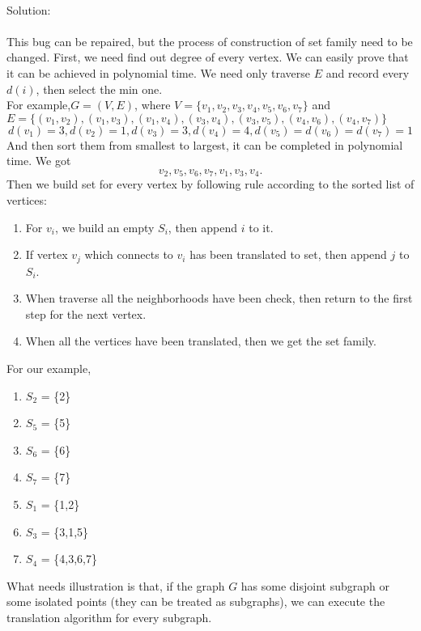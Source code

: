 \documentclass[a4papper]{article}
\theoremstyle{neosn}
\begin{document}
    \correction{}
    \\
    Solution: \\
    \\
    This bug can be repaired, but the process of construction of set family need to be changed.
    First, we need find out degree of every vertex.
    We can easily prove that it can be achieved in polynomial time.
    We need only traverse $E$ and record every $d(i)$, then select the min one. \\
    For example,$G=(V,E)$, where $V=\{v_1, v_2, v_3, v_4, v_5, v_6, v_7\}$ and
    $E=\{(v_1, v_2), (v_1, v_3), (v_1, v_4), (v_3, v_4), (v_3, v_5), (v_4, v_6), (v_4, v_7)\}$
    \[
        d(v_1) = 3, d(v_2) = 1, d(v_3) = 3, d(v_4) = 4, d(v_5) = d(v_6) = d(v_7) = 1
    \]
    And then sort them from smallest to largest, it can be completed in polynomial time.
    We got
    \[
        v_2, v_5, v_6, v_7, v_1, v_3, v_4.
    \]
    Then we build set for every vertex by following rule according to the sorted list of vertices:
    \begin{enumerate}
        \item For $v_i$, we build an empty $S_i$, then append $i$ to it.
        \item If vertex $v_j$ which connects to $v_i$ has been translated to set, then append $j$ to $S_i$.
        \item When traverse all the neighborhoods have been check, then return to the first step for the next vertex.
        \item When all the vertices have been translated, then we get the set family.
    \end{enumerate}

    For our example,
    \begin{enumerate}
        \item $S_2$ = \{2\}
        \item $S_5$ = \{5\}
        \item $S_6$ = \{6\}
        \item $S_7$ = \{7\}
        \item $S_1$ = \{1,2\}
        \item $S_3$ = \{3,1,5\}
        \item $S_4$ = \{4,3,6,7\}
    \end{enumerate}

    What needs illustration is that, if the graph $G$ has some disjoint subgraph or some isolated points
    (they can be treated as subgraphs), we can execute the translation algorithm for every subgraph.\\
\end{document}
